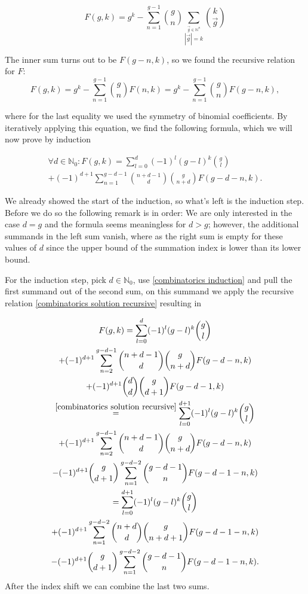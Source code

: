 \documentclass[b5paper,draft,openbib,12pt]{memoir}
\begin{document}
\begin{equation*}
F(g,k)= g^k -  \sum_{n=1}^{g-1} \binom{g}{n} \sum_{\stackrel{\vec{g}\in\mathbb{N}^n}{|\vec{g}|=k}}
 \binom{k}{\vec{g}}
\end{equation*}

The inner sum turns out to be \(F(g-n,k)\), so we found the recursive relation for \(F\):
\begin{equation}\label{combinatorics solution recursive}
F(g,k)= g^k -  \sum_{n=1}^{g-1} \binom{g}{n} F(n,k)= g^k -  \sum_{n=1}^{g-1} \binom{g}{n} F(g-n,k),
\end{equation}

where for the last equality we used the symmetry of binomial coefficients.
By iteratively applying this equation, we find the following formula, which we will now prove by induction

\begin{multline}\label{combinatorics induction}
\forall d\in\mathbb{N}_0: F(g,k)=\sum_{l=0}^d (-1)^l (g-l)^k \binom{g}{l}\\
+(-1)^{d+1} \sum_{n=1}^{g-d-1} \binom{n+d-1}{d} \binom{g}{n+d} F(g-d-n,k).
\end{multline}

We already showed the start of the induction, so what's left is the induction step. Before we do so the
following remark is in order: We are only interested in the case \(d=g\) and the formula seems meaningless
for \(d>g\); however, the additional summands in the left sum vanish, where as the right sum is empty
for these values of \(d\) since the  upper bound of the summation index is lower than its lower bound.

For the induction step, pick \(d\in\mathbb{N}_0\), use \eqref{combinatorics induction} and pull the first summand
 out of the second sum,
on this summand we apply the recursive relation \eqref{combinatorics solution recursive} resulting in

\begin{multline}
F(g,k)=\sum_{l=0}^d (-1)^l (g-l)^k \binom{g}{l}\\
 + (-1)^{d+1}\sum_{n=2}^{g-d-1} \binom{n+d-1}{d}\binom{g}{n+d} F(g-d-n,k)\\
  + (-1)^{d+1} \binom{d}{d} \binom{g}{d+1} F(g-d-1,k)\\
\overset{\eqref{combinatorics solution recursive}}{=}\sum_{l=0}^{d+1} (-1)^l (g-l)^k \binom{g}{l}\\
+(-1)^{d+1} \sum_{n=2}^{g-d-1} \binom{n+d-1}{d} \binom{g}{n+d} F(g-d-n,k)\\
-(-1)^{d+1} \binom{g}{d+1} \sum_{n=1}^{g-d-2} \binom{g-d-1}{n} F(g-d-1-n,k)\\
=\sum_{l=0}^{d+1} (-1)^l (g-l)^k \binom{g}{l}\\
+(-1)^{d+1} \sum_{n=1}^{g-d-2} \binom{n+d}{d} \binom{g}{n+d+1} F(g-d-1-n,k)\\
-(-1)^{d+1} \binom{g}{d+1} \sum_{n=1}^{g-d-2} \binom{g-d-1}{n} F(g-d-1-n,k).
\end{multline}
After the index shift we can combine the last two sums. 
\end{document}
